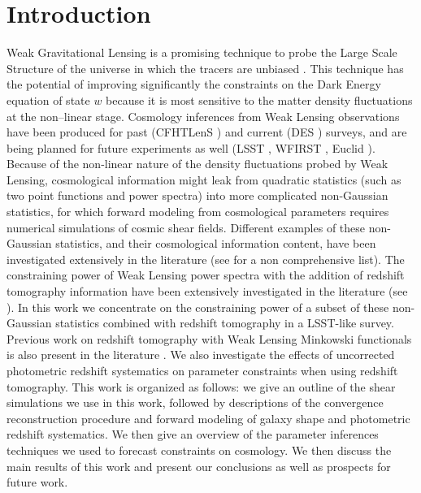 \documentclass[reprint,aps,prd,superscriptaddress,showkeys,showpacs]{revtex4-1}
\begin{document}
\section{Introduction}
%
Weak Gravitational Lensing is a promising technique to probe the Large Scale Structure of the universe in which the tracers are unbiased \citep{wlreview}. This technique has the potential of improving significantly the constraints on the Dark Energy equation of state $w$ because it is most sensitive to the matter density fluctuations at the non--linear stage. Cosmology inferences from Weak Lensing observations have been produced for past (CFHTLenS \citep{cfht1}) and current (DES \citep{DES}) surveys, and are being planned for future experiments as well (LSST \citep{LSST}, WFIRST \citep{WFIRST}, Euclid \citep{Euclid}). Because of the non-linear nature of the density fluctuations probed by Weak Lensing, cosmological information might leak from quadratic statistics (such as two point functions and power spectra) into more complicated non-Gaussian statistics, for which forward modeling from cosmological parameters requires numerical simulations of cosmic shear fields. Different examples of these non-Gaussian statistics, and their cosmological information content, have been investigated extensively in the literature (see \citep{MinkJan,PeaksJan,NG-Marian,NG-Jain1,NG-Jain2,NG-Jain3,NG-Refregier,NG-Dietrich} for a non comprehensive list). The constraining power of Weak Lensing power spectra with the addition of redshift tomography information have been extensively investigated in the literature (see \citep{SongKnox,FangHaiman07,Huterer2006}). In this work we concentrate on the constraining power of a subset of these non-Gaussian statistics combined with redshift tomography in a LSST-like survey. Previous work on redshift tomography with Weak Lensing Minkowski functionals is also present in the literature \citep{MinkJan}. We also investigate the effects of uncorrected photometric redshift systematics on parameter constraints when using redshift tomography. This work is organized as follows: we give an outline of the shear simulations we use in this work, followed by descriptions of the convergence reconstruction procedure and forward modeling of galaxy shape and photometric redshift systematics. We then give an overview of the parameter inferences techniques we used to forecast constraints on cosmology. We then discuss the main results of this work and present our conclusions as well as prospects for future work.  

\end{document}
